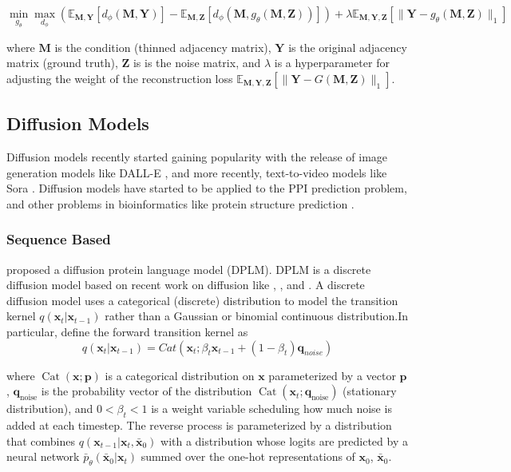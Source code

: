 \documentclass{article}
\begin{document}
\[\min_{g_\theta} \max_{d_\phi} \left( \mathbb{E}_{\mathbf{M}, \mathbf{Y}}[d_\phi(\mathbf{M}, \mathbf{Y})] - \mathbb{E}_{\mathbf{M}, \mathbf{Z}}[d_\phi(\mathbf{M}, g_\theta(\mathbf{M}, \mathbf{Z}))] \right) + \lambda \mathbb{E}_{\mathbf{M}, \mathbf{Y}, \mathbf{Z}}[\| \mathbf{Y} - g_\theta(\mathbf{M}, \mathbf{Z}) \|_1]\]

where \(\mathbf{M}\) is the condition (thinned adjacency matrix), \(\mathbf{Y}\) is the original adjacency matrix (ground truth), \(\mathbf{Z}\) is is the noise matrix, and \(\lambda\) is a hyperparameter for adjusting the weight of the reconstruction loss \(\mathbb{E}_{\mathbf{M}, \mathbf{Y}, \mathbf{Z}}[\| \mathbf{Y} - G(\mathbf{M}, \mathbf{Z}) \|_1]\).

\subsection{Diffusion Models}
Diffusion models recently started gaining popularity with the release of image generation models like DALL-E \citep{ramesh2021zeroshottexttoimagegeneration}, and more recently, text-to-video models like Sora \citep{videoworldsimulators2024}. Diffusion models have started to be applied to the PPI prediction problem, and other problems in bioinformatics like protein structure prediction \citep{abramson_accurate_2024}. 

\subsubsection{Sequence Based}
\citet{wang_diffusion_2024} proposed a diffusion protein language model (DPLM). DPLM is a discrete diffusion model based on recent work on diffusion like \citet{sohl-dickstein_deep_nodate}, \citet{hoogeboom2021argmaxflowsmultinomialdiffusion}, and \citet{austin2023structureddenoisingdiffusionmodels}. A discrete diffusion model uses a categorical (discrete) distribution to model the transition kernel \(q(\mathbf{x}_t|\mathbf{x}_{t-1})\) rather than a Gaussian or binomial continuous distribution.In particular, \citet{wang_diffusion_2024} define the forward transition kernel as 
\[q(\mathbf{x}_t|\mathbf{x}_{t-1}) = Cat(\mathbf{x}_t ; \beta_t\mathbf{x}_{t-1}+(1-\beta_t)\mathbf{q}_{noise})\]

where $\operatorname{Cat}(\mathbf{x}; \mathbf{p})$ is a categorical distribution on $\mathbf{x}$ 
parameterized by a vector $\mathbf{p}$, $\mathbf{q}_{\text{noise}}$ is the probability 
vector of the distribution $\operatorname{Cat}(\mathbf{x}_t; \mathbf{q}_{\text{noise}})$ 
(stationary distribution), and $0 < \beta_t < 1$ is a weight variable scheduling how much noise is added at each timestep. The reverse process is parameterized by 
a distribution that combines $q(\mathbf{x}_{t-1} | \mathbf{x}_t, \bar{\mathbf{x}}_0)$ 
with a distribution whose logits are predicted by a neural network 
$\bar{p}_{\theta}(\bar{\mathbf{x}}_0 | \mathbf{x}_t)$ summed over the one-hot 
representations of $\mathbf{x}_0$, $\bar{\mathbf{x}}_0$.
\end{document}
